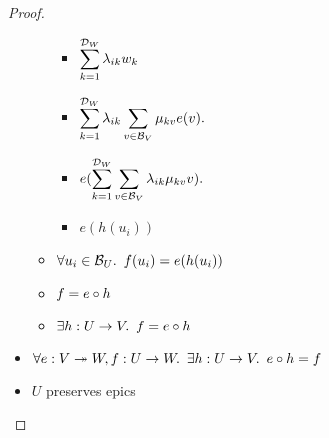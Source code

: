 \begin{prop}
\begin{proof}
\begin{itemize}
\begin{itemize}
\begin{itemize}
              \item[\eqs] $\displaystyle\sum\limits_{k=1}^{\mathcal{D}_{W}}\lambda_{ik}w_k$

              \item[\eqs] $\displaystyle\sum\limits_{k=1}^{\mathcal{D}_{W}}\lambda_{ik}\displaystyle\sum\limits_{v\in\mathcal{B}_{V}}\mu_{kv}e(v).$

              \item[\eqs] $e(\displaystyle\sum\limits_{k=1}^{\mathcal{D}_{W}}\displaystyle\sum\limits_{v\in\mathcal{B}_{V}}\lambda_{ik}\mu_{kv}v).$

              \item[\eqs] $e(h(u_i))$
            \end{itemize}
            \item[\imps]
              $\forall u_i\in\mathcal{B}_{U}\ldotp~f(u_i) = e(h(u_i))$
              \marginnote{$\forall$-\Intro-$\dagger$}

            \item[\iffs]
              $f = e\circ h$
              \marginnote{\Def-$=$}

            \item[\imps]
              $\exists h : U \to V\ldotp~f = e\circ h$
              \marginnote{$\exists$-\Intro}
        \end{itemize}

        \item[\imps]
          $\forall e : V\twoheadrightarrow W, f : U \to W\ldotp~\exists h : U\to V\ldotp~e\circ h = f$
          \marginnote{$\forall$-\Intro-$\star$}

        \item[\imps]
          $U$ preserves epics
          \qedhere
    \end{itemize}
  \end{proof}
\end{prop}
